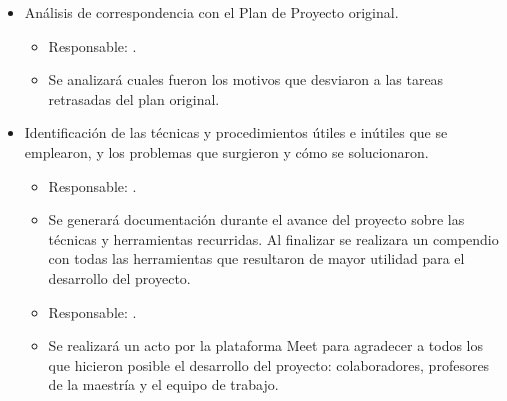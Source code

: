 \documentclass[
11pt, %
codirector, %
]{charter}
\begin{document}
\begin{itemize}
	\item Análisis de correspondencia con el Plan de Proyecto original.
	      \begin{itemize}
		      \item Responsable: \authorname\hspace{1px}.
		      \item Se analizará cuales fueron los motivos que desviaron a las tareas retrasadas del plan original.
	      \end{itemize}
	\item Identificación de las técnicas y procedimientos útiles e inútiles que se emplearon, y los problemas que surgieron y cómo se solucionaron.
	      \begin{itemize}
		      \item Responsable: \authorname\hspace{1px}.
		      \item Se generará documentación durante el avance del proyecto sobre las técnicas y herramientas recurridas. Al finalizar se realizara un compendio con todas las herramientas que resultaron de mayor utilidad para el desarrollo del proyecto.
	      \end{itemize}
	      \begin{itemize}
		      \item Responsable: \authorname\hspace{1px}.
		      \item Se realizará un acto por la plataforma Meet para agradecer a todos los que hicieron posible el desarrollo del proyecto: colaboradores, profesores de la maestría y el equipo de trabajo.
	      \end{itemize}
\end{itemize}
\end{document}
